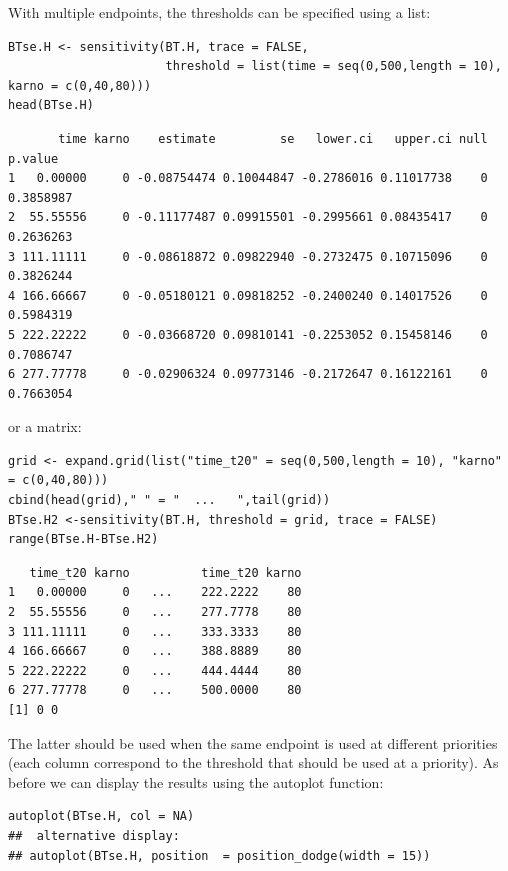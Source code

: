 \documentclass[12pt]{article}
\begin{document}
With multiple endpoints, the thresholds can be specified using a list:
\lstset{language=r,label= ,caption= ,captionpos=b,numbers=none}
\begin{lstlisting}
BTse.H <- sensitivity(BT.H, trace = FALSE,
                      threshold = list(time = seq(0,500,length = 10), karno = c(0,40,80)))
head(BTse.H)
\end{lstlisting}

\begin{verbatim}
       time karno    estimate         se   lower.ci   upper.ci null   p.value
1   0.00000     0 -0.08754474 0.10044847 -0.2786016 0.11017738    0 0.3858987
2  55.55556     0 -0.11177487 0.09915501 -0.2995661 0.08435417    0 0.2636263
3 111.11111     0 -0.08618872 0.09822940 -0.2732475 0.10715096    0 0.3826244
4 166.66667     0 -0.05180121 0.09818252 -0.2400240 0.14017526    0 0.5984319
5 222.22222     0 -0.03668720 0.09810141 -0.2253052 0.15458146    0 0.7086747
6 277.77778     0 -0.02906324 0.09773146 -0.2172647 0.16122161    0 0.7663054
\end{verbatim}


or a matrix:

\lstset{language=r,label= ,caption= ,captionpos=b,numbers=none}
\begin{lstlisting}
grid <- expand.grid(list("time_t20" = seq(0,500,length = 10), "karno" = c(0,40,80)))
cbind(head(grid)," " = "  ...   ",tail(grid))
BTse.H2 <-sensitivity(BT.H, threshold = grid, trace = FALSE)
range(BTse.H-BTse.H2)
\end{lstlisting}

\begin{verbatim}
   time_t20 karno          time_t20 karno
1   0.00000     0   ...    222.2222    80
2  55.55556     0   ...    277.7778    80
3 111.11111     0   ...    333.3333    80
4 166.66667     0   ...    388.8889    80
5 222.22222     0   ...    444.4444    80
6 277.77778     0   ...    500.0000    80
[1] 0 0
\end{verbatim}


The latter should be used when the same endpoint is used at different
priorities (each column correspond to the threshold that should be
used at a priority). As before we can display the results using the
autoplot function:
\lstset{language=r,label= ,caption= ,captionpos=b,numbers=none}
\begin{lstlisting}
autoplot(BTse.H, col = NA)
##  alternative display:
## autoplot(BTse.H, position  = position_dodge(width = 15))
\end{lstlisting}
\end{document}
